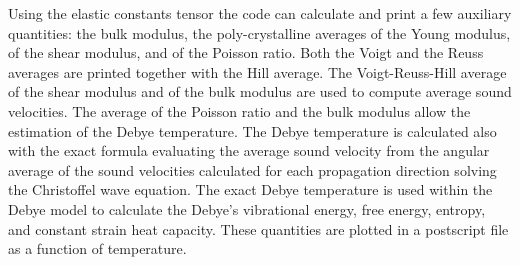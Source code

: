 \documentclass[12pt,a4paper]{article}
\begin{document}
Using the elastic constants tensor the code can calculate and print
a few auxiliary quantities:
the bulk modulus, the poly-crystalline averages of the Young modulus,
of the shear modulus, and of the Poisson ratio. Both the Voigt and the
Reuss averages are printed together with the Hill average.
The Voigt-Reuss-Hill average of the shear modulus and of the bulk modulus are 
used to compute average sound velocities. The average of the Poisson ratio and
the bulk modulus allow the estimation of the Debye 
temperature. The Debye temperature is calculated also with the exact 
formula evaluating the average sound 
velocity from the angular average of the sound velocities calculated 
for each propagation direction solving the Christoffel wave equation.
The exact Debye temperature is used within the Debye model to calculate the
Debye's vibrational energy, free energy, entropy, and constant strain heat
capacity. These quantities are plotted in a postscript file as a function
of temperature.

%
\end{document}
